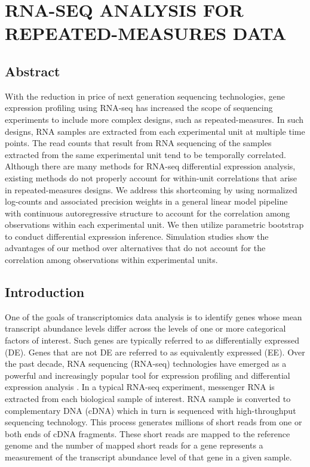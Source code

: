 \chapter{RNA-SEQ ANALYSIS FOR REPEATED-MEASURES DATA}\label{chapter4}

\section*{Abstract}
With the reduction in price of next generation sequencing technologies, gene expression profiling using RNA-seq has increased the scope of sequencing experiments to include more complex designs, such as repeated-measures.  In such designs, RNA samples are extracted from each experimental unit at multiple time points.  The read counts that result from RNA sequencing of the samples extracted from the same experimental unit tend to be temporally correlated.  Although there are many methods for RNA-seq differential expression analysis, existing methods do not properly account for within-unit correlations that arise in repeated-measures designs. We address this shortcoming by using normalized log-counts and associated precision weights in a general linear model pipeline with continuous autoregressive structure to account for the correlation among observations within each experimental unit. We then utilize parametric bootstrap to conduct differential expression inference. Simulation studies show the advantages of our method over alternatives that do not account for the correlation among observations within experimental units. 

\section{Introduction \label{RMintro}}

One of the goals of transcriptomics data  analysis is to identify genes whose mean transcript abundance levels differ across the levels of one or more categorical factors of interest. Such genes are typically referred to as differentially expressed (DE). Genes that are not DE are referred to as equivalently expressed (EE). Over the past decade, RNA sequencing (RNA-seq)  technologies  have emerged as a powerful and increasingly popular tool for expression profiling and differential expression analysis \citep{oshlack2010}. In a typical RNA-seq experiment, messenger  RNA is extracted from each biological sample of interest. RNA sample is converted to complementary DNA (cDNA) which in turn is sequenced with high-throughput sequencing technology. This process generates millions of short reads from one or both ends of cDNA fragments. These  short reads are mapped to the reference genome and the number of mapped short reads for a gene  represents a measurement of the transcript abundance level of that gene in a given sample. 

